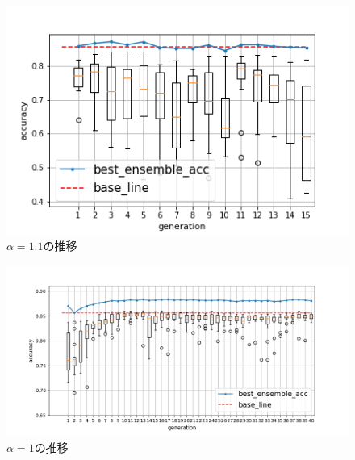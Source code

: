 \documentclass[twocolumn]{jarticle}     %
\begin{document}
\begin{figure}[h]
	\centering
	\includegraphics[scale=0.6]{graph_7.png}
	\caption{$\alpha =1.1$の推移\label{fig:graph4}}
\end{figure}

\begin{figure}[p]
	\centering
	\includegraphics[scale=0.8]{graph_4.png}
	\caption{$\alpha =1$の推移\label{fig:graph1}}
\end{figure}
\end{document}
